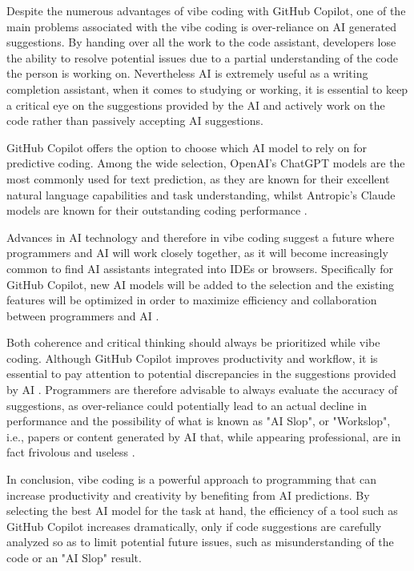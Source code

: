 \documentclass{article}
\begin{document}
Despite the numerous advantages of vibe coding with GitHub Copilot, one of
the main problems associated with the vibe coding is over-reliance on
AI generated suggestions. By handing over all the work to the code assistant,
developers lose the ability to resolve potential issues due to a partial
understanding of the code the person is working on. Nevertheless AI is
extremely useful as a writing completion assistant, when it comes to studying
or working, it is essential to keep a critical eye on the suggestions provided
by the AI and actively work on the code rather than passively accepting AI
suggestions.
\vspace*{.25cm}

GitHub Copilot offers the option to choose which AI model to rely on for
predictive coding. Among the wide selection, OpenAI's ChatGPT models are the
most commonly used for text prediction, as they are known for their
excellent natural language capabilities and task understanding, whilst
Antropic's Claude models are known for their outstanding coding performance
\parencite{github-models}.
\vspace*{.25cm}

\newpage
\pagestyle{empty}
Advances in AI technology and therefore in vibe coding suggest a future where
programmers and AI will work closely together, as it will become increasingly
common to find AI assistants integrated into IDEs or browsers. Specifically
for GitHub Copilot, new AI models will be added to the selection and the
existing features will be optimized in order to maximize efficiency and
collaboration between programmers and AI \parencite{github-discussion}.
\vspace*{.25cm}

Both coherence and critical thinking should always be prioritized while vibe
coding. Although GitHub Copilot improves productivity and workflow, it is
essential to pay attention to potential discrepancies in the suggestions
provided by AI \parencite{github-guide}. Programmers are therefore advisable
to always evaluate the accuracy of suggestions, as over-reliance could
potentially lead to an actual decline in performance and the possibility of
what is known as "AI Slop", or "Workslop", i.e., papers or content generated
by AI that, while appearing professional, are in fact frivolous and useless
\parencite{NiederhofferEtAl2025}.
\vspace*{.25cm}

In conclusion, vibe coding is a powerful approach to programming that can
increase productivity and creativity by benefiting from AI predictions.
By selecting the best AI model for the task at hand, the efficiency of a tool
such as GitHub Copilot increases dramatically, only if code suggestions are
carefully analyzed so as to limit potential future issues, such as
misunderstanding of the code or an "AI Slop" result.
\end{document}
